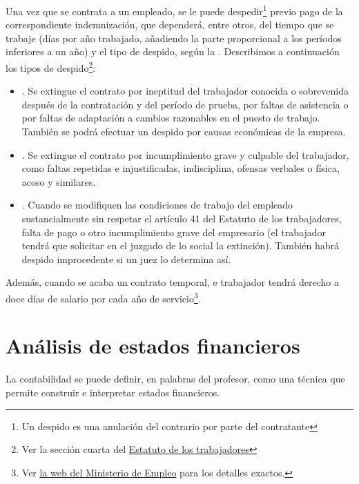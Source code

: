 \documentclass[nochap,palatino,shortheader]{apuntes}
\begin{document}
Una vez que se contrata a un empleado, se le puede despedir\footnote{Un despido es una anulación del contrario por parte del contratante} previo pago de la correspondiente indemnización, que dependerá, entre otros, del tiempo que se trabaje (días por año trabajado, añadiendo la parte proporcional a los períodos inferiores a un año) y el tipo de despido, según la . Describimos a continuación los tipos de despido\footnote{Ver la sección cuarta del \href{https://www.boe.es/buscar/act.php?id=BOE-A-1995-7730&tn=1&p=20151024}{Estatuto de los trabajadores}}:

\begin{itemize}
\item {}. Se extingue el contrato por ineptitud del trabajador conocida o sobrevenida después de la contratación y del período de prueba, por faltas de asistencia o por faltas de adaptación a cambios razonables en el puesto de trabajo. También se podrá efectuar un despido por causas económicas de la empresa.
\item {}. Se extingue el contrato por incumplimiento grave y culpable del trabajador, como faltas repetidas e injustificadas, indisciplina, ofensas verbales o física, acoso y similares.
\item {}. Cuando se modifiquen las condiciones de trabajo del empleado sustancialmente sin respetar el artículo 41 del Estatuto de los trabajadores, falta de pago o otro incumplimiento grave del empresario (el trabajador tendrá que solicitar en el juzgado de lo social la extinción). También habrá despido improcedente si un juez lo determina así.
\end{itemize}

Además, cuando se acaba un contrato temporal, e trabajador tendrá derecho a doce días de salario por cada año de servicio\footnote{Ver \href{http://www.empleo.gob.es/es/Guia/texto/guia_7/contenidos/guia_7_16_4.htm}{la web del Ministerio de Empleo} para los detalles exactos.}.

\section{Análisis de estados financieros}

\begin{defn}[Contabilidad]
La contabilidad se puede definir, en palabras del profesor, como una técnica que permite construir e interpretar estados financieros.
\end{defn}
\end{document}
